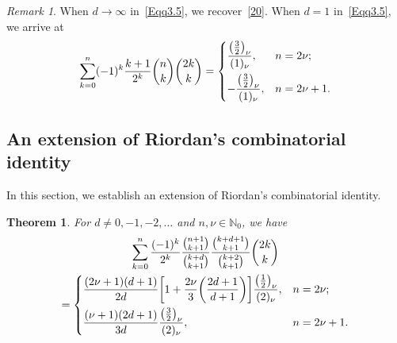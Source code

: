 \documentclass[reqno]{amsart}
\numberwithin{equation}{section}
\theoremstyle{plain}
\newtheorem{thm}{Theorem}[section]
\theoremstyle{remark}
\newtheorem{rem}{Remark}[section]
\begin{document}
\begin{rem}
When $d\to\infty$ in~\eqref{Eqq3.5}, we recover~\eqref{20}. When $d=1$ in~\eqref{Eqq3.5}, we arrive at
\begin{equation*}
\sum_{k=0}^{n}(-1)^k\frac{k+1}{2^k}\binom{n}{k}\binom{2k}{k}
=\begin{dcases}
\frac{\bigl(\frac{3}{2}\bigr)_\nu}{(1)_\nu}, & n=2\nu;\\
-\frac{\bigl(\frac{3}{2}\bigr)_\nu}{(1)_\nu}, & n=2\nu+1.
\end{dcases}
\end{equation*}
\end{rem}

\subsection{An extension of Riordan's combinatorial identity}\label{sec4}

In this section, we establish an extension of Riordan's combinatorial identity.

\begin{thm}\label{thm2}
For $d\neq 0,-1,-2,\dotsc$ and $n,\nu\in\mathbb{N}_0$, we have
\begin{multline}\label{33}
\sum_{k=0}^{n}\frac{(-1)^k}{2^k}\frac{\binom{n+1}{k+1}}{\binom{k+d}{k+1}}\frac{\binom{k+d+1}{k+1}}{\binom{k+2}{k+1}}\binom{2k}{k}\\
=\begin{dcases} \frac{(2\nu+1)(d+1)}{2d}\biggl[1+\frac{2\nu}{3} \biggl(\frac{2d+1}{d+1}\biggr)\biggr]\frac{\bigl(\frac12\bigr)_\nu}{(2)_\nu}, & n=2\nu;\\
\frac{(\nu+1)(2d+1)}{3d}\frac{\bigl(\frac32\bigr)_\nu}{(2)_\nu}, & n=2\nu+1.
\end{dcases}
\end{multline}
\end{thm}
\end{document}
